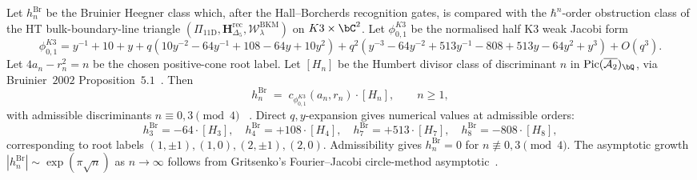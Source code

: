 \begin{theorem}
\label{thm:htbb-heegner-all-order}
Let $h_n^{\mathrm{Br}}$ be the Bruinier Heegner class which, after the
Hall--Borcherds recognition gates, is compared with the $\hbar^n$-order
obstruction class of the HT bulk-boundary-line triangle
$(\Pi_{11\mathrm D}, \mathbf{H}_{\Delta_5}^{\mathrm{rec}},
\mathcal{W}^{\mathrm{BKM}}_\lambda)$ on $K3\times\bC^2$. Let
	\(\phi_{0,1}^{K3}\) be the normalised half K3 weak Jacobi form
	\[
	\phi_{0,1}^{K3}=y^{-1}+10+y
	+q(10y^{-2}-64y^{-1}+108-64y+10y^2)
	+q^2(y^{-3}-64y^{-2}+513y^{-1}-808+513y-64y^2+y^3)+O(q^3).
	\]
	Let \(4a_n-r_n^2=n\) be the chosen positive-cone root label. Let $[H_n]$
	be the Humbert divisor class of discriminant $n$ in
$\mathrm{Pic}(\overline{\mathcal{A}_2})_\bQ$, via
Bruinier~$2002$ Proposition~$5.1$~\cite{Bruinier2002}. Then
\begin{equation}\label{eq:htbb-heegner-identity}
	 h_n^{\mathrm{Br}} \;=\; c_{\phi_{0,1}^{K3}}(a_n,r_n)\cdot [H_n], \qquad n\geq 1,
\end{equation}
	with admissible discriminants \(n\equiv0,3\pmod4\)
	~\cite[Theorem 9.3]{EichlerZagier1985}. Direct \(q,y\)-expansion gives
	numerical values at admissible orders:
\[
 h_3^{\mathrm{Br}} = -64\cdot[H_3], \quad
 h_4^{\mathrm{Br}} = +108\cdot[H_4], \quad
 h_7^{\mathrm{Br}} = +513\cdot[H_7], \quad
 h_8^{\mathrm{Br}} = -808\cdot[H_8],
\]
corresponding to root labels \((1,\pm1),(1,0),(2,\pm1),(2,0)\).
Admissibility gives $h_n^{\mathrm{Br}} = 0$ for $n\not\equiv 0, 3
\pmod 4$. The asymptotic growth $|h_n^{\mathrm{Br}}| \sim
\exp(\pi\sqrt{n})$ as $n\to\infty$ follows from Gritsenko's
Fourier--Jacobi circle-method asymptotic~\cite[\S 2]{Gritsenko1999}.
\end{theorem}

